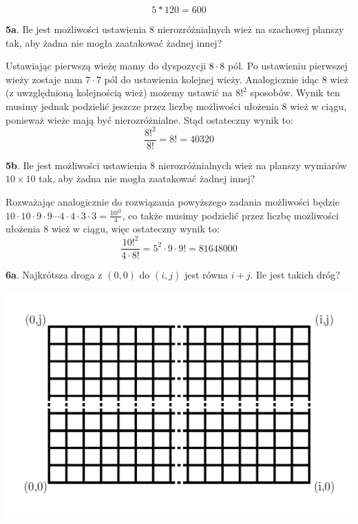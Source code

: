 \documentclass{article}
\begin{document}
$$5*120=600$$

\begin{flushleft}
\large \textbf{5a}. Ile jest możliwości ustawienia 8 nierozróżnialnych wież na szachowej planszy tak, aby żadna nie mogła zaatakować żadnej innej?
\end{flushleft}
\normalsize{}

Ustawiając pierwszą wieżę mamy do dyspozycji $8\cdot8$ pól. Po ustawieniu pierwszej wieży zostaje nam $7\cdot7$ pól do ustawienia kolejnej wieży. Analogicznie idąc 8 wież (z uwzględnioną kolejnością wież) możemy ustawić na $8!^2$ sposobów. Wynik ten musimy jednak podzielić jeszcze przez liczbę możliwości ułożenia 8 wież w ciągu, ponieważ wieże mają być nierozróżnialne. Stąd ostateczny wynik to: $$\frac{8!^2}{8!}=8!=40320$$

\begin{flushleft}
\large \textbf{5b}. Ile jest możliwości ustawienia 8 nierozróżnialnych wież na planszy wymiarów $10\times10$ tak, aby żadna nie mogła zaatakować żadnej innej?
\end{flushleft}

Rozważając analogicznie do rozwiązania powyższego zadania możliwości będzie $10\cdot10\cdot9\cdot9\cdots4\cdot4\cdot3\cdot3=\frac{10!^2}{4}$, co także musimy podzielić przez liczbę możliwości ułożenia 8 wież w ciągu, więc ostateczny wynik to:
$$\frac{10!^2}{4\cdot8!}=5^2\cdot9\cdot9!=81648000$$



\begin{flushleft}
\large \textbf{6a}. Najkrótsza droga z $(0,0)$ do $(i,j)$ jest równa $i+j$. Ile jest takich dróg?
\end{flushleft}
\begin{center}
\includegraphics[scale=0.17]{path 1.jpg}
\end{center}
\end{document}
